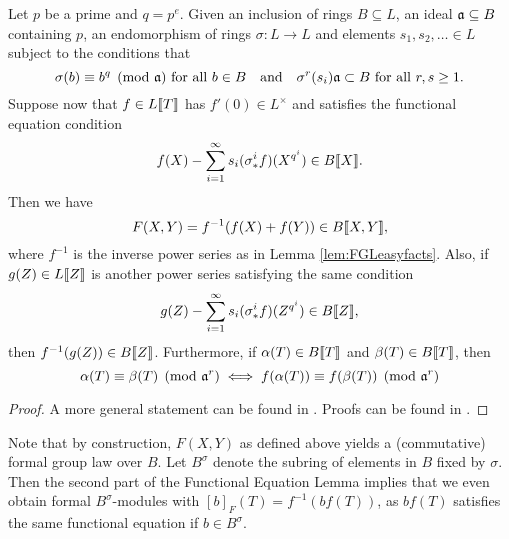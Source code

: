 \documentclass[../main.tex]{subfiles}
\begin{document}
\begin{prop} 
  Let $p$ be a prime and $q = p^e$. Given an inclusion of rings $B \subseteq
  L$, an ideal $\mathfrak{a} \subseteq B$ containing $p$, an endomorphism of rings
  $\sigma: L \to L$ and elements $s_1, s_2, \dots \in L$ subject to the conditions
  that 
  \begin{equation*}
    \sigma(b) \equiv b^q \pmod {\mathfrak{a}} \text{ for all } b \in B \quad \text{and} \quad 
    \sigma^r(s_i) \mathfrak{a} \subset B \text{ for all } r,s \geq 1.
  \end{equation*}
  Suppose now that $f \in L\llbracket T \rrbracket$ has $f'(0) \in L^\times$ and
  satisfies the functional equation condition
  \begin{equation*}
    f(X) - \sum_{i=1}^\infty s_i (\sigma^i_* f)(X^{q^i}) \in B\llbracket X \rrbracket.
  \end{equation*}
  Then we have 
  \begin{equation*}
    F(X,Y) = f^{-1}(f(X) + f(Y)) \in B \llbracket X,Y \rrbracket,
  \end{equation*}
  where $f^{-1}$ is the inverse power series as in Lemma \ref{lem:FGLeasyfacts}.
  Also, if $g(Z) \in L\llbracket Z \rrbracket$ is another power series satisfying the 
  same condition
  \begin{equation*}
    g(Z) - \sum_{i=1}^\infty s_i (\sigma^i_* f)(Z^{q^i}) \in B\llbracket Z \rrbracket,
  \end{equation*}
  then $f^{-1}(g(Z)) \in B\llbracket Z \rrbracket$. 
  Furthermore, if $\alpha(T) \in B\llbracket T \rrbracket$ and $\beta(T) \in B \llbracket T \rrbracket$, then
  \begin{equation} \label{eq:funceqlemcongruence}
    \alpha(T) \equiv \beta(T) \pmod {\mathfrak{a}^r} \iff f(\alpha(T)) \equiv f(\beta(T))
    \pmod {\mathfrak{a}^r}
  \end{equation}

  \begin{proof}
    A more general statement can be found in \cite[Section
    2]{hazewinkel1979funceqexp}. Proofs can be found in \cite[Sections 2 and
    10]{hazewinkel1978formal}.
  \end{proof}
\end{prop}
Note that by construction, $F(X,Y)$ as defined above yields a (commutative)
formal group law over $B$. 
Let $B^\sigma$ denote the subring of elements in $B$ fixed by $\sigma$. Then 
the second part of the Functional Equation Lemma implies that we even obtain
formal $B^\sigma$-modules with $[b]_F(T) = f^{-1}(b f(T))$, as $bf(T)$
satisfies the same functional equation if $b \in B^\sigma$. 
\end{document}
